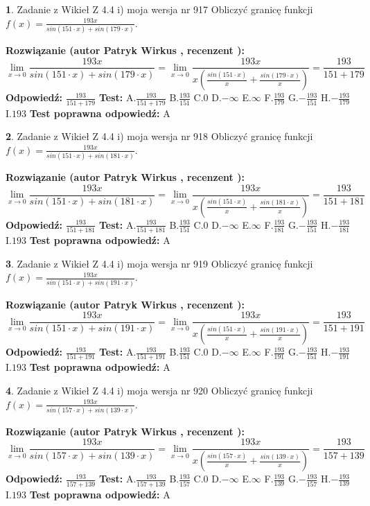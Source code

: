 \documentclass[12pt, a4paper]{article}
\theoremstyle{definition} %
\newtheorem{zad}{}
\newcommand{\zadStart}[1]{\begin{zad}#1\newline}
\newcommand{\zadStop}{\end{zad}}
\newcommand{\rozwStart}[2]{\noindent \textbf{Rozwiązanie (autor #1 , recenzent #2): }\newline}
\newcommand{\rozwStop}{\newline}
\newcommand{\odpStart}{\noindent \textbf{Odpowiedź:}\newline}
\newcommand{\odpStop}{\newline}
\newcommand{\testStart}{\noindent \textbf{Test:}\newline}
\newcommand{\testStop}{\newline}
\newcommand{\kluczStart}{\noindent \textbf{Test poprawna odpowiedź:}\newline}
\newcommand{\kluczStop}{\newline}
\begin{document}
\zadStart{Zadanie z Wikieł Z 4.4 i) moja wersja nr 917}
Obliczyć granicę funkcji $f(x)=\frac{193x}{sin(151\cdot x) +sin(179\cdot x)}$.
\zadStop
\rozwStart{Patryk Wirkus}{}
$$\lim\limits_{x\to 0}\frac{193x}{sin(151\cdot x) +sin(179\cdot x)}=\lim\limits_{x\to 0}\frac{193x}{x(\frac{sin(151\cdot x)}{x}+\frac{sin(179\cdot x)}{x})}=\frac{193}{151+179}$$
\rozwStop
\odpStart
$\frac{193}{151+179}$
\odpStop
\testStart
A.$\frac{193}{151+179}$
B.$\frac{193}{151}$
C.$0$
D.$-\infty$
E.$\infty$
F.$\frac{193}{179}$
G.$-\frac{193}{151}$
H.$-\frac{193}{179}$
I.$193$
\testStop
\kluczStart
A
\kluczStop



\zadStart{Zadanie z Wikieł Z 4.4 i) moja wersja nr 918}
Obliczyć granicę funkcji $f(x)=\frac{193x}{sin(151\cdot x) +sin(181\cdot x)}$.
\zadStop
\rozwStart{Patryk Wirkus}{}
$$\lim\limits_{x\to 0}\frac{193x}{sin(151\cdot x) +sin(181\cdot x)}=\lim\limits_{x\to 0}\frac{193x}{x(\frac{sin(151\cdot x)}{x}+\frac{sin(181\cdot x)}{x})}=\frac{193}{151+181}$$
\rozwStop
\odpStart
$\frac{193}{151+181}$
\odpStop
\testStart
A.$\frac{193}{151+181}$
B.$\frac{193}{151}$
C.$0$
D.$-\infty$
E.$\infty$
F.$\frac{193}{181}$
G.$-\frac{193}{151}$
H.$-\frac{193}{181}$
I.$193$
\testStop
\kluczStart
A
\kluczStop



\zadStart{Zadanie z Wikieł Z 4.4 i) moja wersja nr 919}
Obliczyć granicę funkcji $f(x)=\frac{193x}{sin(151\cdot x) +sin(191\cdot x)}$.
\zadStop
\rozwStart{Patryk Wirkus}{}
$$\lim\limits_{x\to 0}\frac{193x}{sin(151\cdot x) +sin(191\cdot x)}=\lim\limits_{x\to 0}\frac{193x}{x(\frac{sin(151\cdot x)}{x}+\frac{sin(191\cdot x)}{x})}=\frac{193}{151+191}$$
\rozwStop
\odpStart
$\frac{193}{151+191}$
\odpStop
\testStart
A.$\frac{193}{151+191}$
B.$\frac{193}{151}$
C.$0$
D.$-\infty$
E.$\infty$
F.$\frac{193}{191}$
G.$-\frac{193}{151}$
H.$-\frac{193}{191}$
I.$193$
\testStop
\kluczStart
A
\kluczStop



\zadStart{Zadanie z Wikieł Z 4.4 i) moja wersja nr 920}
Obliczyć granicę funkcji $f(x)=\frac{193x}{sin(157\cdot x) +sin(139\cdot x)}$.
\zadStop
\rozwStart{Patryk Wirkus}{}
$$\lim\limits_{x\to 0}\frac{193x}{sin(157\cdot x) +sin(139\cdot x)}=\lim\limits_{x\to 0}\frac{193x}{x(\frac{sin(157\cdot x)}{x}+\frac{sin(139\cdot x)}{x})}=\frac{193}{157+139}$$
\rozwStop
\odpStart
$\frac{193}{157+139}$
\odpStop
\testStart
A.$\frac{193}{157+139}$
B.$\frac{193}{157}$
C.$0$
D.$-\infty$
E.$\infty$
F.$\frac{193}{139}$
G.$-\frac{193}{157}$
H.$-\frac{193}{139}$
I.$193$
\testStop
\kluczStart
A
\kluczStop
\end{document}
